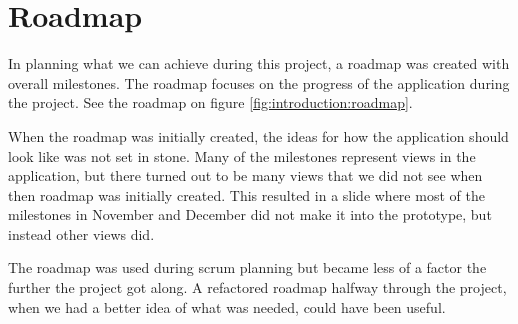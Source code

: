 \section{Roadmap}
In planning what we can achieve during this project, a roadmap was created with overall milestones. 
The roadmap focuses on the progress of the application during the project. 
See the roadmap on figure \ref{fig:introduction:roadmap}.

When the roadmap was initially created, the ideas for how the application should look like was not set in stone.
Many of the milestones represent views in the application, but there turned out to be many views that we did not see when then roadmap was initially created.
This resulted in a slide where most of the milestones in November and December did not make it into the prototype, but instead other views did.

The roadmap was used during \gls{scrum} planning but became less of a factor the further the project got along. 
A refactored roadmap halfway through the project, when we had a better idea of what was needed, could have been useful.



